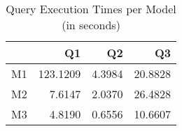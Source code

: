 \begin{table}[H]
\centering
\caption{Query Execution Times per Model (in seconds)}
\label{tab:model_comparison}
\begin{tabular}{lrrr}
\toprule
 & Q1 & Q2 & Q3 \\
\midrule
M1 & 123.1209 & 4.3984 & 20.8828 \\
M2 & 7.6147 & 2.0370 & 26.4828 \\
M3 & 4.8190 & 0.6556 & 10.6607 \\
\bottomrule
\end{tabular}
\end{table}
